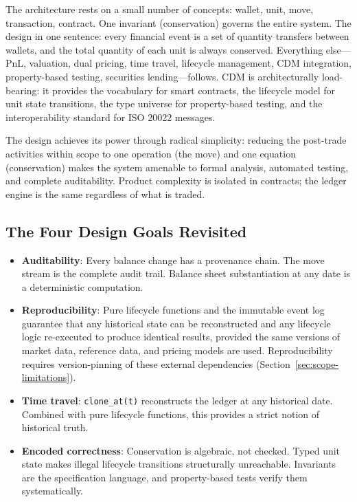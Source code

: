 \documentclass[11pt,a4paper]{article}
\begin{document}
The architecture rests on a small number of concepts: wallet, unit, move, transaction, contract. One invariant (conservation) governs the entire system. The design in one sentence: every financial event is a set of quantity transfers between wallets, and the total quantity of each unit is always conserved. Everything else---PnL, valuation, dual pricing, time travel, lifecycle management, CDM integration, property-based testing, securities lending---follows. CDM is architecturally load-bearing: it provides the vocabulary for smart contracts, the lifecycle model for unit state transitions, the type universe for property-based testing, and the interoperability standard for ISO 20022 messages.

The design achieves its power through radical simplicity: reducing the post-trade activities within scope to one operation (the move) and one equation (conservation) makes the system amenable to formal analysis, automated testing, and complete auditability. Product complexity is isolated in contracts; the ledger engine is the same regardless of what is traded.

\subsection{The Four Design Goals Revisited}

\begin{itemize}
\item \textbf{Auditability}: Every balance change has a provenance chain. The move stream is the complete audit trail. Balance sheet substantiation at any date is a deterministic computation.
\item \textbf{Reproducibility}: Pure lifecycle functions and the immutable event log guarantee that any historical state can be reconstructed and any lifecycle logic re-executed to produce identical results, provided the same versions of market data, reference data, and pricing models are used. Reproducibility requires version-pinning of these external dependencies (Section~\ref{sec:scope-limitations}).
\item \textbf{Time travel}: \texttt{clone\_at(t)} reconstructs the ledger at any historical date. Combined with pure lifecycle functions, this provides a strict notion of historical truth.
\item \textbf{Encoded correctness}: Conservation is algebraic, not checked. Typed unit state makes illegal lifecycle transitions structurally unreachable. Invariants are the specification language, and property-based tests verify them systematically.
\end{itemize}
\end{document}
